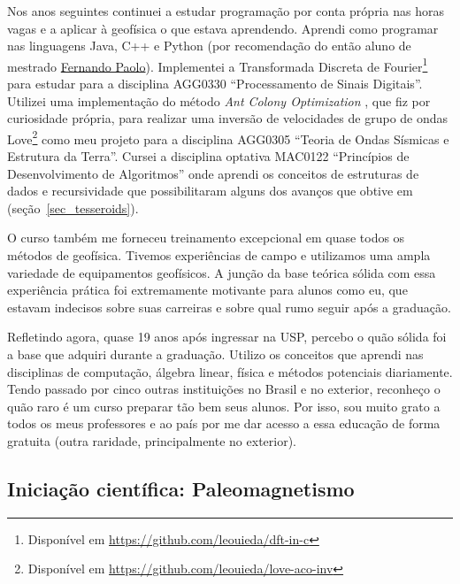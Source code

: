\documentclass[10pt,a4paper,oneside]{book}
\begin{document}
Nos anos seguintes continuei a estudar programação por conta própria nas horas
vagas e a aplicar à geofísica o que estava aprendendo.
Aprendi como programar nas linguagens Java, C++ e Python (por recomendação do
então aluno de mestrado \href{https://www.linkedin.com/in/fspaolo/}{Fernando Paolo}).
Implementei a Transformada Discreta de Fourier\footnote{Disponível em
\url{https://github.com/leouieda/dft-in-c}} para estudar para a disciplina
AGG0330 ``Processamento de Sinais Digitais''.
Utilizei uma implementação do método \textit{Ant Colony Optimization}
\citep{Socha2008}, que fiz por curiosidade própria, para realizar uma inversão
de velocidades de grupo de ondas
Love\footnote{Disponível em \url{https://github.com/leouieda/love-aco-inv}}
como meu projeto para a disciplina AGG0305 ``Teoria de Ondas Sísmicas e
Estrutura da Terra''.
Cursei a disciplina optativa MAC0122 ``Princípios de Desenvolvimento de
Algoritmos'' onde aprendi os conceitos de estruturas de dados e recursividade
que possibilitaram alguns dos avanços que obtive em \citet{Uieda2016}
(seção~\ref{sec_tesseroids}).

O curso também me forneceu treinamento excepcional em quase todos os métodos de
geofísica.
Tivemos experiências de campo e utilizamos uma ampla variedade de equipamentos
geofísicos.
A junção da base teórica sólida com essa experiência prática foi
extremamente motivante para alunos como eu, que estavam indecisos sobre suas
carreiras e sobre qual rumo seguir após a graduação.

Refletindo agora, quase 19 anos após ingressar na USP, percebo o quão sólida
foi a base que adquiri durante a graduação. Utilizo os conceitos que aprendi
nas disciplinas de computação, álgebra linear, física e métodos potenciais
diariamente. Tendo passado por cinco outras instituições no Brasil e no
exterior, reconheço o quão raro é um curso preparar tão bem seus alunos.
Por isso, sou muito grato a todos os meus professores e ao país por me dar
acesso a essa educação de forma gratuita (outra raridade, principalmente no
exterior).

\subsection{Iniciação científica: Paleomagnetismo}
\end{document}
